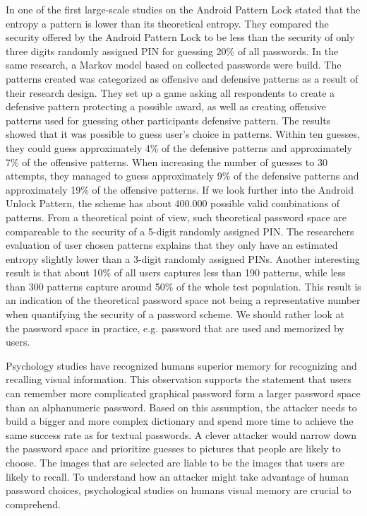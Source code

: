     In one of the first large-scale studies on the Android Pattern Lock \cite{Uellenbeck} stated that the entropy a pattern is lower than its theoretical entropy. They compared the security offered by the Android Pattern Lock to be less than the security of only three digits randomly assigned PIN for guessing 20\% of all passwords. In the same research, a Markov model based on collected passwords were build. The patterns created was categorized as offensive and defensive patterns as a result of their research design. They set up a game asking all respondents to create a defensive pattern protecting a possible award, as well as creating offensive patterns used for guessing other participants defensive pattern. The results showed that it was possible to guess user's choice in patterns. Within ten guesses, they could guess approximately 4\% of the defensive patterns and approximately 7\% of the offensive patterns. When increasing the number of guesses to 30 attempts, they managed to guess approximately 9\% of the defensive patterns and approximately 19\% of the offensive patterns. If we look further into the Android Unlock Pattern, the scheme has about 400.000 possible valid combinations of patterns. From a theoretical point of view, such theoretical password space are compareable to the security of a 5-digit randomly assigned PIN. The researchers evaluation of user chosen patterns explains that they only have an estimated entropy slightly lower than a 3-digit randomly assigned PINs. Another interesting result is that about 10\% of all users captures less than 190 patterns, while less than 300 patterns capture around 50\% of the whole test population. This result is an indication of the theoretical password space not being a representative number when quantifying the security of a password scheme. We should rather look at the password space in practice, e.g. password that are used and memorized by users.

    Psychology studies have recognized humans superior memory for recognizing and recalling visual information. This observation supports the statement that users can remember more complicated graphical password form a larger password space than an alphanumeric password. Based on this assumption, the attacker needs to build a bigger and more complex dictionary and spend more time to achieve the same success rate as for textual passwords. A clever attacker would narrow down the password space and prioritize guesses to pictures that people are likely to choose. The images that are selected are liable to be the images that users are likely to recall. To understand how an attacker might take advantage of human password choices, psychological studies on humans visual memory are crucial to comprehend.
